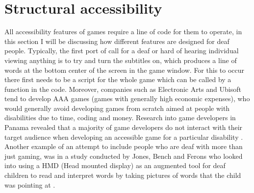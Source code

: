\documentclass{scrartcl}
\begin{document}
\section{Structural accessibility}
All accessibility features of games require a line of code for them to operate, in this section I will be discussing how different features are designed for deaf people.
Typically, the first port of call for a deaf or hard of hearing individual viewing anything is to try and turn the subtitles on, which produces a line of words at the bottom center of the screen in the game window. For this to occur there first needs to be a script for the whole game which can be called by a function in the code. Moreover, companies such as Electronic Arts and Ubisoft tend to develop AAA games (games with generally high economic expenses), who would generally avoid developing games from scratch aimed at people with disabilities due to time, coding and money. Research into game developers in Panama revealed that a majority of game developers do not interact with their target audience when developing an accessible game for a particular disability \cite {moreno}. Another example of an attempt to include people who are deaf with more than just gaming, was in a study conducted by Jones, Bench and Ferons who looked into using a HMD (Head mounted display) as an augmented tool for deaf children to read and interpret words by taking pictures of words that the child was pointing at \cite {Jones}.
\end{document}
